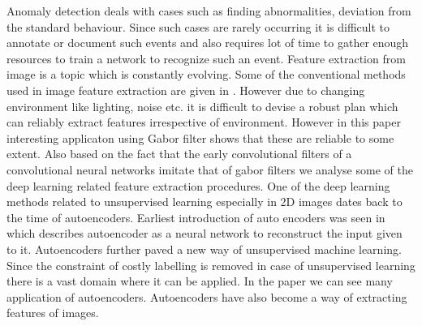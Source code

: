 \documentclass[conference]{IEEEtran}
\begin{document}
Anomaly detection deals with cases such as finding abnormalities, deviation from the standard behaviour. Since such cases are rarely occurring it is difficult to annotate or document such events and also requires lot of time to gather enough resources to train a network to recognize such an event. Feature extraction from image is a topic which is constantly evolving. Some of the conventional methods used in image feature extraction are given in \cite{6783417}. However due to changing environment like lighting, noise etc. it is difficult to devise a robust plan which can reliably extract features irrespective of environment. However in this paper interesting applicaton using Gabor filter \cite{6482091} shows that these are reliable to some extent. Also based on the fact that the early convolutional filters of a convolutional neural networks imitate that of gabor filters we analyse some of the deep learning related feature extraction procedures. One of the deep learning methods related to unsupervised learning especially in 2D images dates back to the time of autoencoders. Earliest introduction of auto encoders was seen in \cite{Rumelhart:1986} which describes autoencoder as a neural network to reconstruct the input given to it. Autoencoders further paved a new way of unsupervised machine learning. Since the constraint of costly labelling is removed in case of unsupervised learning there is a vast domain where it can be applied. In the paper \cite{bank2021autoencoders} we can see many application of autoencoders. Autoencoders have also become a way of extracting features of images. 
\end{document}
